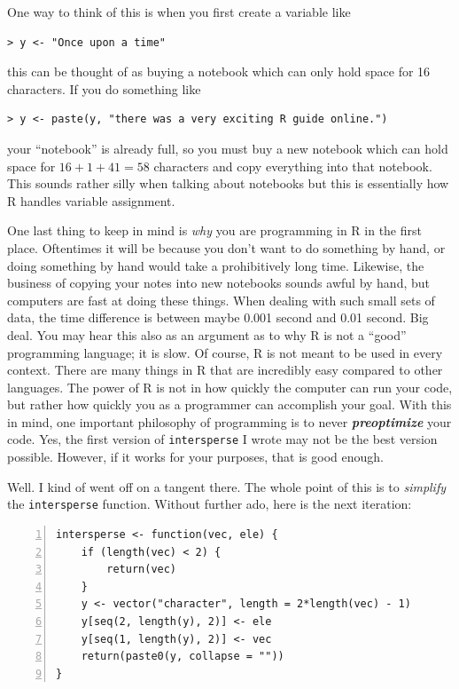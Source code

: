 \documentclass[12pt]{article}
\theoremstyle{remark}
\newcommand{\vocab}[1]{\textbf{\emph{#1}}}
\begin{document}
One way to think of this is when you first create a variable like
\begin{verbatim}
> y <- "Once upon a time"
\end{verbatim}
this can be thought of as buying a notebook which can only hold space for 16 characters. If you do something like
\begin{verbatim}
> y <- paste(y, "there was a very exciting R guide online.")
\end{verbatim}

your ``notebook'' is already full, so you must buy a new notebook which can hold space for $16 + 1 + 41 = 58$ characters and copy everything into that notebook. This sounds rather silly when talking about notebooks but this is essentially how R handles variable assignment.

One last thing to keep in mind is \emph{why} you are programming in R in the first place. Oftentimes it will be because you don't want to do something by hand, or doing something by hand would take a prohibitively long time. Likewise, the business of copying your notes into new notebooks sounds awful by hand, but computers are fast at doing these things. When dealing with such small sets of data, the time difference is between maybe 0.001 second and 0.01 second. Big deal. You may hear this also as an argument as to why R is not a ``good'' programming language; it is slow. Of course, R is not meant to be used in every context. There are many things in R that are incredibly easy compared to other languages. The power of R is not in how quickly the computer can run your code, but rather how quickly you as a programmer can accomplish your goal. With this in mind, one important philosophy of programming is to never \vocab{preoptimize} your code. Yes, the first version of \verb|intersperse| I wrote may not be the best version possible. However, if it works for your purposes, that is good enough.

Well. I kind of went off on a tangent there. The whole point of this is to \emph{simplify} the \verb|intersperse| function. Without further ado, here is the next iteration:

\begin{Verbatim}[frame=single, fontsize=\small, numbers=left]
intersperse <- function(vec, ele) {
	if (length(vec) < 2) {
		return(vec)
	}
	y <- vector("character", length = 2*length(vec) - 1)
	y[seq(2, length(y), 2)] <- ele
	y[seq(1, length(y), 2)] <- vec
	return(paste0(y, collapse = ""))
}
\end{Verbatim}
\end{document}
